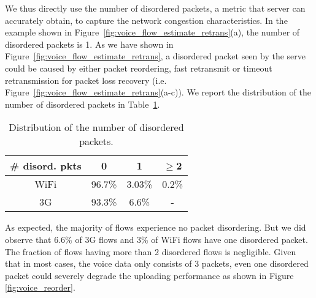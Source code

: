 We thus directly use the number of disordered packets, a metric that server can accurately obtain, to capture the network congestion characteristics. In the example shown in Figure~\ref{fig:voice_flow_estimate_retrans}(a), the number of disordered packets is 1. As we have shown in Figure~\ref{fig:voice_flow_estimate_retrans}, a disordered packet seen by the serve could be caused by either packet reordering, fast retransmit or timeout retransmission for packet loss recovery (i.e. Figure~\ref{fig:voice_flow_estimate_retrans}(a-c)). We report the distribution of the number of disordered packets in Table~\ref{tab:voice_reorder}.


\begin{table}[th]
\caption{Distribution of the number of disordered packets.}
\label{tab:voice_reorder}
\centering
\renewcommand{\arraystretch}{1.0}
\begin{tabular}{c|c|c|c}
	\hline
	\# disord. pkts & 0 & 1 & $\ge$2 \\
	\hline
	WiFi & 96.7\% & 3.03\% & 0.2\% \\
	\hline
	3G & 93.3\% & 6.6\% & - \\
	\hline
\end{tabular}
\end{table}

As expected, the majority of flows experience no packet disordering. But we did observe that 6.6\% of 3G flows and 3\% of WiFi flows have one disordered packet. The fraction of flows having more than 2 disordered flows is negligible. Given that in most cases, the voice data only consists of 3 packets, even one disordered packet could severely degrade the uploading performance as shown in Figure \ref{fig:voice_reorder}.



